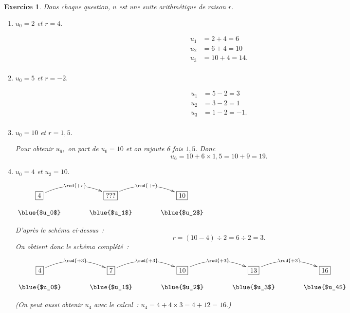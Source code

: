 \documentclass[10pt]{article}
\newtheorem{exo}{Exercice}
\begin{document}
\begin{exo}

Dans chaque question, $u$ est une suite arithmétique de raison $r.$

\begin{enumerate}
\item $u_0=2$ et $r=4.$

\begin{align*}
u_1&=2+4=6\\
u_2&=6+4=10\\
u_3&=10+4=14.\\
\end{align*}
\item $u_0=5$ et $r=-2.$

\begin{align*}
u_1&=5-2=3\\
u_2&=3-2=1\\
u_3&=1-2=-1.\\
\end{align*}

\item $u_0=10$ et $r=1,5.$

Pour obtenir $u_6,$ on part de $u_0=10$ et on rajoute 6 fois $1,5.$ Donc
\[u_6=10+6\times 1,5=10+9=19.\]

\item $u_0=4$ et $u_2=10.$

\begin{center}
    $\xymatrix@R=0.5pc@C=3pc{
    *+[F]+{4} \ar@/^0.5cm/[r]|{\red{+r}} & 
    *+[F]+{???} \ar@/^0.5cm/[r]|{\red{+r}} & *+[F]+{10} \\
    \txt{\blue{$u_0$}}&
    \txt{\blue{$u_1$}}&\txt{\blue{$u_2$}}
    }$
    \end{center}
    
    D'après le schéma ci-dessus~:
    \[r=(10-4)\div 2=6\div 2=3.\]  On obtient donc le schéma complété~:
    
    \begin{center}
    $\xymatrix@R=0.5pc@C=3pc{
    *+[F]+{4} \ar@/^0.5cm/[r]|{\red{+3}} & 
    *+[F]+{7} \ar@/^0.5cm/[r]|{\red{+3}} & 
    *+[F]+{10} \ar@/^0.5cm/[r]|{\red{+3}} & 
    *+[F]+{13} \ar@/^0.5cm/[r]|{\red{+3}}& 
    *+[F]+{16} \\
    \txt{\blue{$u_0$}}&
    \txt{\blue{$u_1$}}&\txt{\blue{$u_2$}}&
    \txt{\blue{$u_3$}}&
    \txt{\blue{$u_4$}}
    }$
    \end{center}
    
    (On peut aussi obtenir $u_4$ avec le calcul~: $u_4=4+4\times 3=4+12=16.$)


\end{enumerate}
\end{exo}
\end{document}
